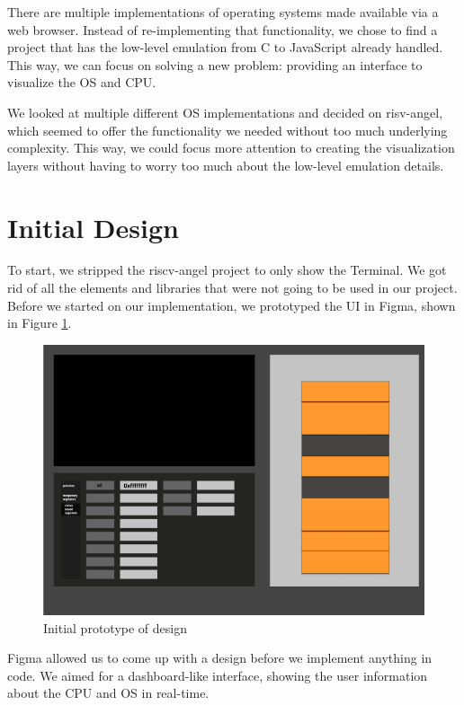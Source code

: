 There are multiple implementations of operating systems made available via a web
browser. Instead of re-implementing that functionality, we chose to find a project that
has the low-level emulation from C to JavaScript already handled. This way, we can
focus on solving a new problem: providing an interface to
visualize the OS and CPU.

We looked at multiple different OS implementations and decided on risv-angel,
which seemed to offer the
functionality we needed without too much underlying complexity. This way, we could
focus more attention to creating the visualization layers without having to worry
too much about the low-level emulation details.

\section{Initial Design}

To start, we stripped the riscv-angel project to only show the Terminal.
We got rid of all the elements and libraries that were not going to be used in our project.
Before we started on our implementation, we prototyped the UI in Figma, shown in Figure \ref{fig:proto1}.

\begin{figure}[H]
  \includegraphics[scale=0.4]{prototype1}
  \caption{Initial prototype of design}
  \label{fig:proto1}
  \centering
\end{figure}

Figma allowed us to come up with a design before we implement anything in code.
We aimed for a dashboard-like interface, showing the user
information about the CPU and OS in real-time.

